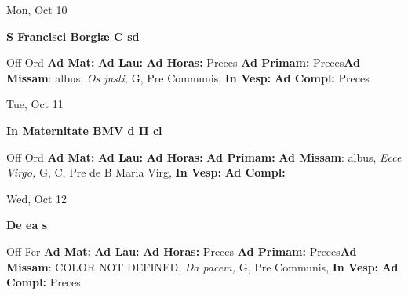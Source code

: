 \documentclass[10pt]{book}
\begin{document}
\begin{center}
\begin{minipage}{3.5in}
\vspace{2em}
\begin{center}Mon, Oct 10
\end{center}
\textbf{ \large S Francisci Borgiæ C
\textnormal{\normalsize sd}}

\begin{justify}Off Ord
\textbf{Ad Mat: }
\textbf{Ad Lau: }
\textbf{Ad Horas: }Preces
\textbf{Ad Primam: }Preces\textbf{Ad Missam}: albus, \textit{Os justi,} G, Pre Communis, 
\textbf{In Vesp: }
\textbf{Ad Compl: }Preces
\end{justify}
\end{minipage}
\end{center}

\begin{center}
\begin{minipage}{3.5in}
\vspace{2em}
\begin{center}Tue, Oct 11
\end{center}
\textbf{ \large In Maternitate BMV
\textnormal{\normalsize d II cl}}

\begin{justify}Off Ord
\textbf{Ad Mat: }
\textbf{Ad Lau: }
\textbf{Ad Horas: }
\textbf{Ad Primam: }\textbf{Ad Missam}: albus, \textit{Ecce Virgo,} G, C, Pre de B Maria Virg, 
\textbf{In Vesp: }
\textbf{Ad Compl: }
\end{justify}
\end{minipage}
\end{center}

\begin{center}
\begin{minipage}{3.5in}
\vspace{2em}
\begin{center}Wed, Oct 12
\end{center}
\textbf{ \large De ea
\textnormal{\normalsize s}}

\begin{justify}Off Fer
\textbf{Ad Mat: }
\textbf{Ad Lau: }
\textbf{Ad Horas: }Preces
\textbf{Ad Primam: }Preces\textbf{Ad Missam}: COLOR NOT DEFINED, \textit{Da pacem,} G, Pre Communis, 
\textbf{In Vesp: }
\textbf{Ad Compl: }Preces
\end{justify}
\end{minipage}
\end{center}
\end{document}

